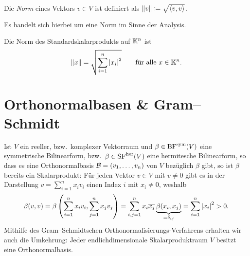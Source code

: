 \begin{definition}
  Die \emph{Norm} eines Vektors $v \in V$ ist definiert als $\left\| v \right\| \coloneqq \sqrt{ \left\langle v, v \right\rangle }$.
\end{definition}

\begin{remark}
  Es handelt sich hierbei um eine Norm im Sinne der Analysis.
\end{remark}

\begin{example}
  Die Norm des Standardskalarprodukts auf $\mathbb{K}^n$ ist
  \[
      \left\| x \right\|
    = \sqrt{ \sum_{i=1}^n \left| x_i \right|^2 }
    \qquad
    \text{für alle $x \in \mathbb{K}^n$}.
  \]
\end{example}






\section{Orthonormalbasen \& Gram--Schmidt}

Ist $V$ ein reeller, bzw.\ komplexer Vektorraum und $\beta \in \operatorname{BF}^{\operatorname{sym}}(V)$ eine symmetrische Bilinearform, bzw.\ $\beta \in \operatorname{SF}^{\operatorname{her}}(V)$ eine hermitesche Bilinearform, so dass es eine Orthonormalbasis $\mathcal{B} = (v_1, \dotsc, v_n)$ von $V$ bezüglich $\beta$ gibt, so ist $\beta$ bereits ein Skalarprodukt:
Für jeden Vektor $v \in V$ mit $v \neq 0$ gibt es in der Darstellung $v = \sum_{i=1}^n x_i v_i$ einen Index $i$ mit $x_i \neq 0$, weshalb
\[
    \beta(v,v)
  = \beta\left( \sum_{i=1}^n x_i v_i, \sum_{j=1}^n x_j v_j \right)
  = \sum_{i,j = 1}^n x_i \overline{x_j} \underbrace{ \beta(x_i, x_j)}_{= \delta_{ij}}
  = \sum_{i=1}^n \left| x_i \right|^2
  > 0.
\]
Mithilfe des Gram--Schmidtschen Orthonormalisierungs-Verfahrens erhalten wir auch die Umkehrung:
Jeder endlichdimensionale Skalarproduktraum $V$ besitzt eine Orthonormalbasis.

